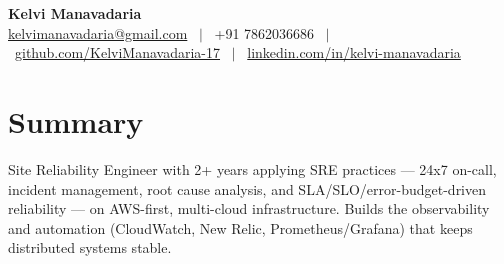 \documentclass[a4paper,10.999999pt]{article}
\begin{document}
    \pagestyle{empty}



    \begin{center}
    \LARGE{\textbf{Kelvi Manavadaria}} \\[1.5pt]
    {\small
    \href{mailto:kelvimanavadaria@gmail.com}{kelvimanavadaria@gmail.com} \ $|$ \
    +91 7862036686 \ $|$ \
    \href{https://github.com/KelviManavadaria-17}{github.com/KelviManavadaria-17} \ $|$ \
    \href{https://www.linkedin.com/in/kelvi-manavadaria/}{linkedin.com/in/kelvi-manavadaria}
    }
    \end{center}

    \vspace{0.5pt}


    \section{Summary}
Site Reliability Engineer with 2+ years applying SRE practices — 24x7 on-call, incident management, root cause analysis, and SLA/SLO/error-budget-driven reliability — on AWS-first, multi-cloud infrastructure. Builds the observability and automation (CloudWatch, New Relic, Prometheus/Grafana) that keeps distributed systems stable.

\end{document}
